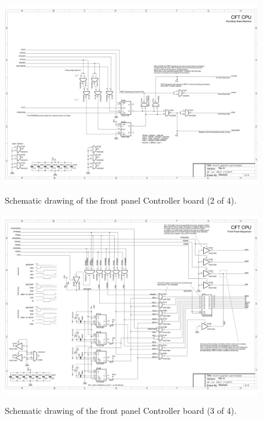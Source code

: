 \documentclass[11pt,a4paper,twocolumns]{article}
\begin{document}
\begin{figure}
\centering
\includegraphics[width=0.95\textheight,angle=90]{figs/front-panel-controller-2.jpg}\\
\caption{\label{fig-schematic-front-panel-controller-2}Schematic drawing of the front panel Controller board (2 of 4).}
\end{figure}

\begin{figure}
\centering
\includegraphics[width=0.95\textheight,angle=90]{figs/front-panel-controller-3.jpg}\\
\caption{\label{fig-schematic-front-panel-controller-3}Schematic drawing of the front panel Controller board (3 of 4).}
\end{figure}
\end{document}
